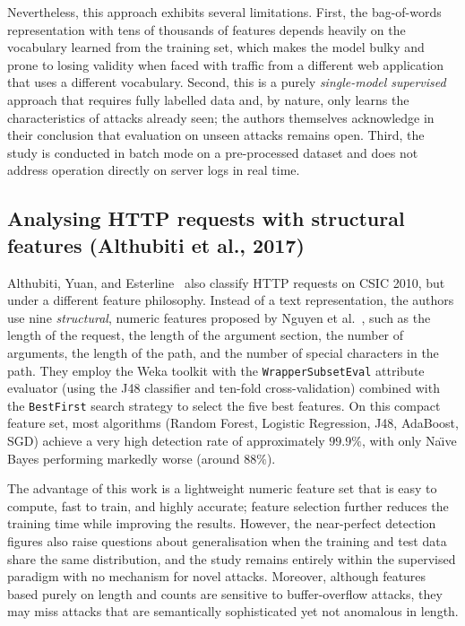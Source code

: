 Nevertheless, this approach exhibits several limitations. First, the
bag-of-words representation with tens of thousands of features depends
heavily on the vocabulary learned from the training set, which makes the
model bulky and prone to losing validity when faced with traffic from a
different web application that uses a different vocabulary. Second, this is
a purely \emph{single-model supervised} approach that requires fully
labelled data and, by nature, only learns the characteristics of attacks
already seen; the authors themselves acknowledge in their conclusion that
evaluation on unseen attacks remains open. Third, the study is conducted
in batch mode on a pre-processed dataset and does not address operation
directly on server logs in real time.

\subsection{Analysing HTTP requests with structural features
(Althubiti et al., 2017)}

Althubiti, Yuan, and Esterline~\cite{althubiti2017} also classify HTTP
requests on CSIC 2010, but under a different feature philosophy. Instead of
a text representation, the authors use nine \emph{structural}, numeric
features proposed by Nguyen et al.~\cite{nguyen2011}, such as the length of
the request, the length of the argument section, the number of arguments,
the length of the path, and the number of special characters in the path.
They employ the Weka toolkit with the \texttt{WrapperSubsetEval} attribute
evaluator (using the J48 classifier and ten-fold cross-validation) combined
with the \texttt{BestFirst} search strategy to select the five best
features. On this compact feature set, most algorithms (Random Forest,
Logistic Regression, J48, AdaBoost, SGD) achieve a very high detection
rate of approximately $99.9\%$, with only Na\"{\i}ve Bayes performing
markedly worse (around $88\%$).

The advantage of this work is a lightweight numeric feature set that is
easy to compute, fast to train, and highly accurate; feature selection
further reduces the training time while improving the results. However,
the near-perfect detection figures also raise questions about
generalisation when the training and test data share the same
distribution, and the study remains entirely within the supervised
paradigm with no mechanism for novel attacks. Moreover, although features
based purely on length and counts are sensitive to buffer-overflow
attacks, they may miss attacks that are semantically sophisticated yet not
anomalous in length.

